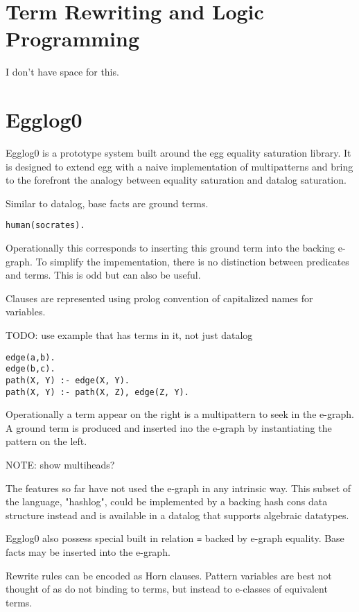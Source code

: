\documentclass[sigplan,10pt,review,anonymous]{acmart}
\begin{document}

\section{Term Rewriting and Logic Programming}
I don't have space for this.

\section{Egglog0}

Egglog0 is a prototype system built around the egg equality saturation library. It is designed to extend egg with a naive implementation of multipatterns and bring to the forefront the analogy between equality saturation and datalog saturation.

Similar to datalog, base facts are ground terms.
\begin{lstlisting}
human(socrates).
\end{lstlisting}
Operationally this corresponds to inserting this ground term into the backing e-graph. To simplify the impementation, there is no distinction between predicates and terms. This is odd but can also be useful.

Clauses are represented using prolog convention of capitalized names for variables.

TODO: use example that has terms in it, not just datalog

\begin{lstlisting}
edge(a,b).
edge(b,c).
path(X, Y) :- edge(X, Y).
path(X, Y) :- path(X, Z), edge(Z, Y).

\end{lstlisting}
Operationally a term appear on the right is a multipattern to seek in the e-graph. A ground term is produced and inserted ino the e-graph by instantiating the pattern on the left.

NOTE: show multiheads?

The features so far have not used the e-graph in any intrinsic way. This subset of the language, "hashlog", could be implemented by a backing hash cons data structure instead and is available in a datalog that supports algebraic datatypes.

Egglog0 also possess special built in relation \lstinline{=} backed by e-graph equality. Base facts may be inserted into the e-graph.

Rewrite rules can be encoded as Horn clauses. Pattern variables are best not thought of as do not binding to terms, but instead to e-classes of equivalent terms.
\end{document}
